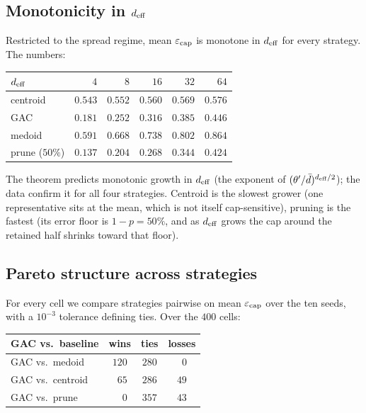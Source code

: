 \subsection{Monotonicity in ${d_{\mathrm{eff}}}$}
\label{sec:e1:monotonicity}

Restricted to the spread regime, mean $\varepsilon_{\mathrm{cap}}$ is monotone
in ${d_{\mathrm{eff}}}$ for every strategy. The numbers:

\begin{center}
\begin{tabular}{lrrrrr}
\toprule
${d_{\mathrm{eff}}}$ & $4$ & $8$ & $16$ & $32$ & $64$ \\
\midrule
centroid       & $0.543$ & $0.552$ & $0.560$ & $0.569$ & $0.576$ \\
GAC            & $0.181$ & $0.252$ & $0.316$ & $0.385$ & $0.446$ \\
medoid         & $0.591$ & $0.668$ & $0.738$ & $0.802$ & $0.864$ \\
prune ($50\%$) & $0.137$ & $0.204$ & $0.268$ & $0.344$ & $0.424$ \\
\bottomrule
\end{tabular}
\end{center}

The theorem predicts monotonic growth in ${d_{\mathrm{eff}}}$ (the exponent of
$(\theta'/\bar{d})^{{d_{\mathrm{eff}}}/2}$); the data confirm it for all four
strategies. Centroid is the slowest grower (one representative sits at
the mean, which is not itself cap-sensitive), pruning is the fastest
(its error floor is $1 - p = 50\%$, and as ${d_{\mathrm{eff}}}$ grows the cap around
the retained half shrinks toward that floor).

\subsection{Pareto structure across strategies}
\label{sec:e1:pareto}

For every cell we compare strategies pairwise on mean
$\varepsilon_{\mathrm{cap}}$ over the ten seeds, with a $10^{-3}$ tolerance
defining ties. Over the $400$ cells:

\begin{center}
\begin{tabular}{lccc}
\toprule
GAC vs.\ baseline & wins & ties & losses \\
\midrule
GAC vs.\ medoid    & $120$ & $280$ & $\phantom{0}0$ \\
GAC vs.\ centroid  & $\phantom{0}65$ & $286$ & $49$ \\
GAC vs.\ prune     & $\phantom{0}\phantom{0}0$ & $357$ & $43$ \\
\bottomrule
\end{tabular}
\end{center}

